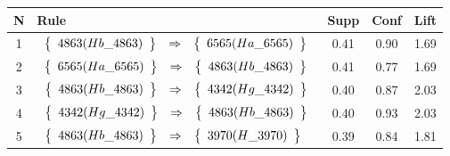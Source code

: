 \begin{longtable}{| c | l | c | c | c |}
\hline
\textbf{N} & \textbf{Rule} & \textbf{Supp} & \textbf{Conf} & \textbf{Lift} \\ \hline
1 & $\begin{array}{c c c}\left\{\begin{array}{c}4863 (Hb\_4863)\end{array}\right\} & \Rightarrow & \left\{\begin{array}{c}6565 (Ha\_6565)\end{array}\right\}\end{array}$ & 0.41 & 0.90 & 1.69 \\ \hline
2 & $\begin{array}{c c c}\left\{\begin{array}{c}6565 (Ha\_6565)\end{array}\right\} & \Rightarrow & \left\{\begin{array}{c}4863 (Hb\_4863)\end{array}\right\}\end{array}$ & 0.41 & 0.77 & 1.69 \\ \hline
3 & $\begin{array}{c c c}\left\{\begin{array}{c}4863 (Hb\_4863)\end{array}\right\} & \Rightarrow & \left\{\begin{array}{c}4342 (Hg\_4342)\end{array}\right\}\end{array}$ & 0.40 & 0.87 & 2.03 \\ \hline
4 & $\begin{array}{c c c}\left\{\begin{array}{c}4342 (Hg\_4342)\end{array}\right\} & \Rightarrow & \left\{\begin{array}{c}4863 (Hb\_4863)\end{array}\right\}\end{array}$ & 0.40 & 0.93 & 2.03 \\ \hline
5 & $\begin{array}{c c c}\left\{\begin{array}{c}4863 (Hb\_4863)\end{array}\right\} & \Rightarrow & \left\{\begin{array}{c}3970 (H\_3970)\end{array}\right\}\end{array}$ & 0.39 & 0.84 & 1.81 \\ \hline

\end{longtable}
